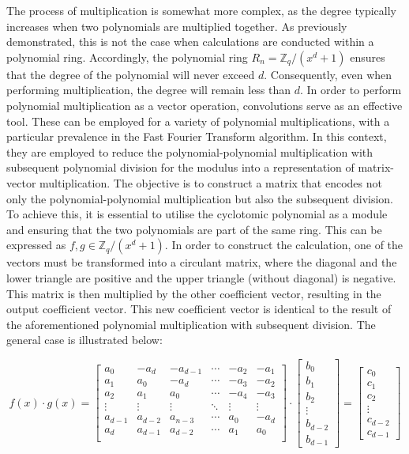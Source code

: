 The process of multiplication is somewhat more complex, as the degree typically increases when two polynomials are multiplied together. As previously demonstrated, this is not the case when calculations are conducted within a polynomial ring. Accordingly, the polynomial ring $R_n = \mathbb{Z}_q/(x^d+1)$ ensures that the degree of the polynomial will never exceed $d$. Consequently, even when performing multiplication, the degree will remain less than $d$. In order to perform polynomial multiplication as a vector operation, convolutions serve as an effective tool. These can be employed for a variety of polynomial multiplications, with a particular prevalence in the Fast Fourier Transform algorithm. In this context, they are employed to reduce the polynomial-polynomial multiplication with subsequent polynomial division for the modulus into a representation of matrix-vector multiplication. The objective is to construct a matrix that encodes not only the polynomial-polynomial multiplication but also the subsequent division. To achieve this, it is essential to utilise the cyclotomic polynomial as a module and ensuring that the two polynomials are part of the same ring. This can be expressed as $f, g \in \mathbb{Z}_q/(x^d+1)$. In order to construct the calculation, one of the vectors must be transformed into a circulant matrix, where the diagonal and the lower triangle are positive and the upper triangle (without diagonal) is negative. This matrix is then multiplied by the other coefficient vector, resulting in the output coefficient vector. This new coefficient vector is identical to the result of the aforementioned polynomial multiplication with subsequent division. The general case is illustrated below:

$$
  f(x) \cdot g(x)
  =
  \begin{bmatrix}
    a_0     & -a_{d}  & -a_{d-1} & \cdots & -a_2   & -a_1   \\
    a_1     & a_0     & -a_{d}   & \cdots & -a_3   & -a_2   \\
    a_2     & a_1     & a_0      & \cdots & -a_4   & -a_3   \\
    \vdots  & \vdots  & \vdots   & \ddots & \vdots & \vdots \\
    a_{d-1} & a_{d-2} & a_{n-3}  & \cdots & a_0    & -a_{d} \\
    a_{d}   & a_{d-1} & a_{d-2}  & \cdots & a_1    & a_0    \\
  \end{bmatrix}
  \cdot
  \begin{bmatrix}
    b_0     \\
    b_1     \\
    b_2     \\
    \vdots  \\
    b_{d-2} \\
    b_{d-1}
  \end{bmatrix}
  = 
  \begin{bmatrix}
    c_0     \\
    c_1     \\
    c_2     \\
    \vdots  \\
    c_{d-2} \\
    c_{d-1}
  \end{bmatrix}
$$

